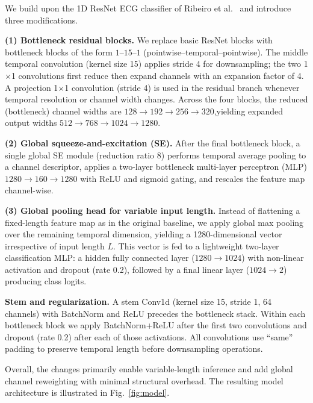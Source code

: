 
We build upon the 1D ResNet ECG classifier of Ribeiro et al.~\cite{ribeiro2020automatic} and introduce three modifications.

\textbf{(1) Bottleneck residual blocks.} We replace basic ResNet blocks with bottleneck blocks of the form $1$–$15$–$1$ (pointwise--temporal--pointwise). The middle temporal convolution (kernel size 15) applies stride 4 for downsampling; the two 1$\times$1 convolutions first reduce then expand channels with an expansion factor of 4. A projection 1$\times$1 convolution (stride 4) is used in the residual branch whenever temporal resolution or channel width changes. Across the four blocks, the reduced (bottleneck) channel widths are $128 \to 192 \to 256 \to 320$,yielding expanded output widths $512 \to 768 \to 1024 \to 1280$.

\textbf{(2) Global squeeze-and-excitation (SE).} After the final bottleneck block, a single global SE module (reduction ratio 8) \cite{hu2018senet} performs temporal average pooling to a channel descriptor, applies a two-layer bottleneck multi-layer perceptron (MLP) $1280 \to 160 \to 1280$ with ReLU and sigmoid gating, and rescales the feature map channel-wise.

\textbf{(3) Global pooling head for variable input length.} Instead of flattening a fixed-length feature map as in the original baseline, we apply global max pooling over the remaining temporal dimension, yielding a 1280-dimensional vector irrespective of input length $L$. This vector is fed to a lightweight two-layer classification MLP: a hidden fully connected layer ($1280 \to 1024$) with non-linear activation and dropout (rate 0.2), followed by a final linear layer ($1024 \to 2$) producing class logits.

\textbf{Stem and regularization.} A stem Conv1d (kernel size 15, stride 1, 64 channels) with BatchNorm and ReLU precedes the bottleneck stack. Within each bottleneck block we apply BatchNorm+ReLU after the first two convolutions and dropout (rate 0.2) after each of those activations. All convolutions use “same” padding to preserve temporal length before downsampling operations.

Overall, the changes primarily enable variable-length inference and add global channel reweighting with minimal structural overhead. The resulting model architecture is illustrated in Fig.~\ref{fig:model}.

